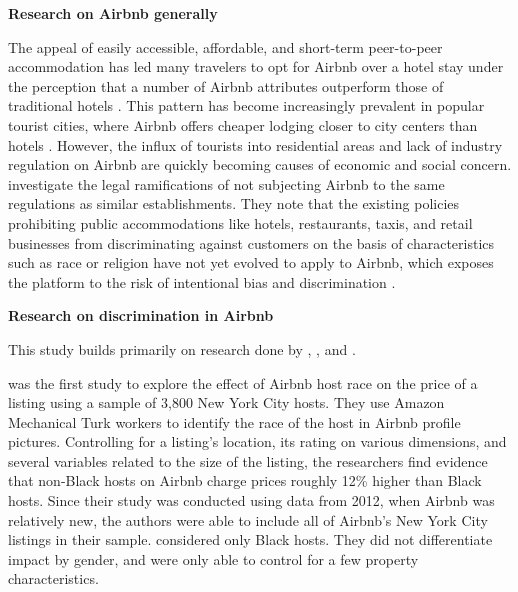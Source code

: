 \vspace{5mm}
\textbf{Research on Airbnb generally}

The appeal of easily accessible, affordable, and short-term peer-to-peer accommodation has led many travelers to opt for Airbnb over a hotel stay under the perception that a number of Airbnb attributes outperform those of traditional hotels \citep{guttentag}. This pattern has become increasingly prevalent in popular tourist cities, where Airbnb offers cheaper lodging closer to city centers than hotels \citep{gutierrez}. However, the influx of tourists into residential areas and lack of industry regulation on Airbnb are quickly becoming causes of economic and social concern. \cite{leong} investigate the legal ramifications of not subjecting Airbnb to the same regulations as similar establishments. They note that the existing policies prohibiting public accommodations like hotels, restaurants, taxis, and retail businesses from discriminating against customers on the basis of characteristics such as race or religion have not yet evolved to apply to Airbnb, which exposes the platform to the risk of intentional bias and discrimination \citep{leong}. 




\vspace{5mm}
\textbf{Research on discrimination in Airbnb}

This study builds primarily on research done by \cite{edelman}, \cite{wang}, and \cite{kakar}. 

\cite{edelman} was the first study to explore the effect of Airbnb host race on the price of a listing using a sample of 3,800 New York City hosts. They use Amazon Mechanical Turk workers to identify the race of the host in Airbnb profile pictures. Controlling for a listing's location, its rating on various dimensions, and several variables related to the size of the listing, the researchers find evidence that non-Black hosts on Airbnb charge prices roughly 12\% higher than Black hosts. Since their study was conducted using data from 2012, when Airbnb was relatively new, the authors were able to include all of Airbnb's New York City listings in their sample. \cite{edelman} considered only Black hosts. They did not differentiate impact by gender, and were only able to control for a few property characteristics. 

